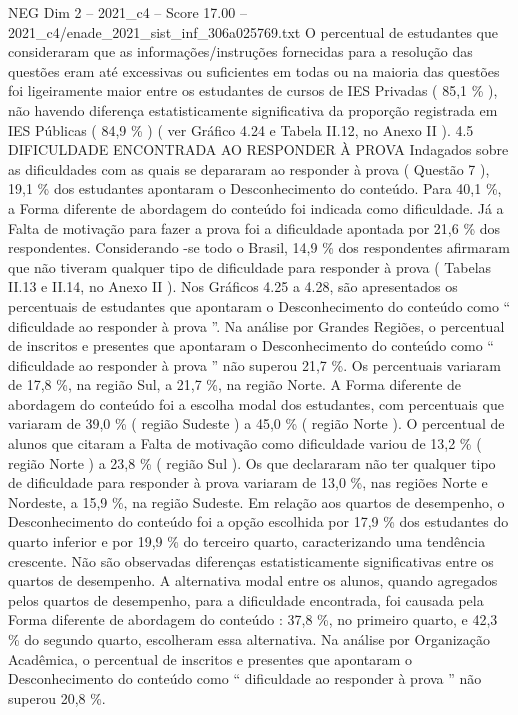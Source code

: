 \begin{textsample}{NEG Dim 2 – 2021\_c4 – Score 17.00 – 2021\_c4/enade\_2021\_sist\_inf\_306a025769.txt}
O percentual de estudantes que consideraram que as informações/instruções fornecidas para a resolução das questões eram até excessivas ou suficientes em todas ou na maioria das questões foi ligeiramente maior entre os estudantes de cursos de IES Privadas ( 85,1 \% ), não havendo diferença estatisticamente significativa da proporção registrada em IES Públicas ( 84,9 \% ) ( ver Gráfico 4.24 e Tabela II.12, no Anexo II ). 4.5 DIFICULDADE ENCONTRADA AO RESPONDER À PROVA Indagados sobre as dificuldades com as quais se depararam ao responder à prova ( Questão 7 ), 19,1 \% dos estudantes apontaram o Desconhecimento do conteúdo.
Para 40,1 \%, a Forma diferente de abordagem do conteúdo foi indicada como dificuldade.
Já a Falta de motivação para fazer a prova foi a dificuldade apontada por 21,6 \% dos respondentes.
Considerando -se todo o Brasil, 14,9 \% dos respondentes afirmaram que não tiveram qualquer tipo de dificuldade para responder à prova ( Tabelas II.13 e II.14, no Anexo II ).
Nos Gráficos 4.25 a 4.28, são apresentados os percentuais de estudantes que apontaram o Desconhecimento do conteúdo como “ dificuldade ao responder à prova ”.
Na análise por Grandes Regiões, o percentual de inscritos e presentes que apontaram o Desconhecimento do conteúdo como “ dificuldade ao responder à prova ” não superou 21,7 \%.
Os percentuais variaram de 17,8 \%, na região Sul, a 21,7 \%, na região Norte.
A Forma diferente de abordagem do conteúdo foi a escolha modal dos estudantes, com percentuais que variaram de 39,0 \% ( região Sudeste ) a 45,0 \% ( região Norte ).
O percentual de alunos que citaram a Falta de motivação como dificuldade variou de 13,2 \% ( região Norte ) a 23,8 \% ( região Sul ).
Os que declararam não ter qualquer tipo de dificuldade para responder à prova variaram de 13,0 \%, nas regiões Norte e Nordeste, a 15,9 \%, na região Sudeste.
Em relação aos quartos de desempenho, o Desconhecimento do conteúdo foi a opção escolhida por 17,9 \% dos estudantes do quarto inferior e por 19,9 \% do terceiro quarto, caracterizando uma tendência crescente.
Não são observadas diferenças estatisticamente significativas entre os quartos de desempenho.
A alternativa modal entre os alunos, quando agregados pelos quartos de desempenho, para a dificuldade encontrada, foi causada pela Forma diferente de abordagem do conteúdo : 37,8 \%, no primeiro quarto, e 42,3 \% do segundo quarto, escolheram essa alternativa.
Na análise por Organização Acadêmica, o percentual de inscritos e presentes que apontaram o Desconhecimento do conteúdo como “ dificuldade ao responder à prova ” não superou 20,8 \%.

\end{textsample}
